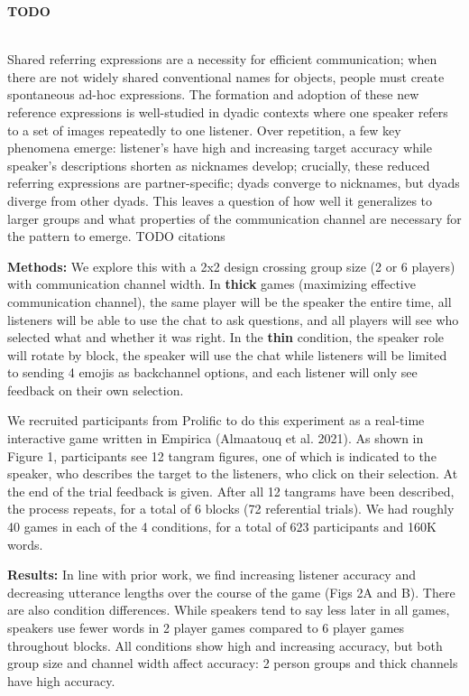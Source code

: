 \documentclass[11pt,a4paper]{article}
\renewcommand{\title}[1]{\textbf{#1}\\}
\newcommand{\authors}[1]{\iftoggle{anonymous}{\phantom{#1}}{#1}\\}
\newcommand{\email}[1]{\iftoggle{anonymous}{\phantom{#1}}{#1}}
\begin{document}


\title{TODO}
\authors{Veronica Boyce, Robert Hawkins, Noah Goodman, Michael C. Frank} 
\email{vboyce@stanford.edu}
\newline
%

Shared referring expressions are a necessity for efficient communication; when there are not widely shared conventional names for objects, people must create spontaneous ad-hoc expressions. The formation and adoption of these new reference expressions is well-studied in dyadic contexts where one speaker refers to a set of images repeatedly to one listener. Over repetition, a few key phenomena emerge: listener's have high and increasing target accuracy while speaker's descriptions shorten as nicknames develop; crucially, these reduced referring expressions are partner-specific; dyads converge to nicknames, but dyads diverge from other dyads. This leaves a question of how well it generalizes to larger groups and what properties of the communication channel are necessary for the pattern to emerge.  TODO citations

\textbf{Methods:} We explore this with a 2x2 design crossing group size (2 or 6 players) with communication channel width. In \textbf{thick} games (maximizing effective communication channel), the same player will be the speaker the entire time, all listeners will be able to use the chat to ask questions, and all players will see who selected what and whether it was right. In the \textbf{thin} condition, the speaker role will rotate by block, the speaker will use the chat while listeners will be limited to sending 4 emojis as backchannel options, and each listener will only see feedback on their own selection. 

We recruited participants from Prolific to do this experiment as a real-time interactive game written in Empirica (Almaatouq et al. 2021). As shown in Figure 1,  participants see 12 tangram figures, one of which is indicated to the speaker, who describes the target to the listeners, who click on their selection.  At the end of the trial feedback is given.  After all 12 tangrams have been described, the process repeats, for a total of 6 blocks (72 referential trials). We had roughly 40 games in each of the 4 conditions, for a total of 623 participants and 160K words. 


\textbf{Results:} In line with prior work, we find increasing listener accuracy and decreasing utterance lengths over the course of the game (Figs 2A and B). There are also condition differences. While speakers tend to say less later in all games, speakers use fewer words in 2 player games compared to 6 player games throughout blocks.  All conditions show high and increasing accuracy, but both group size and channel width affect accuracy: 2 person groups and thick channels have high accuracy. 
\end{document}
